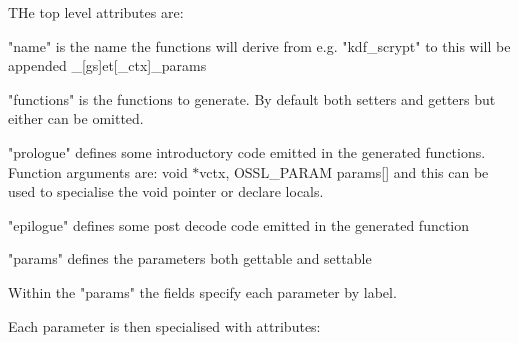 THe top level attributes are\+:


\begin{DoxyItemize}
\item "{}name"{} is the name the functions will derive from e.\+g. "{}kdf\+\_\+scrypt"{} to this will be appended \+\_\+\mbox{[}gs\mbox{]}et\mbox{[}\+\_\+ctx\mbox{]}\+\_\+params
\item "{}functions"{} is the functions to generate. By default both setters and getters but either can be omitted.
\item "{}prologue"{} defines some introductory code emitted in the generated functions. Function arguments are\+: {\ttfamily void \texorpdfstring{$\ast$}{*}vctx, OSSL\+\_\+\+PARAM params\mbox{[}\mbox{]}} and this can be used to specialise the void pointer or declare locals.
\item "{}epilogue"{} defines some post decode code emitted in the generated function
\item "{}params"{} defines the parameters both gettable and settable
\end{DoxyItemize}

Within the "{}params"{} the fields specify each parameter by label.

Each parameter is then specialised with attributes\+:


